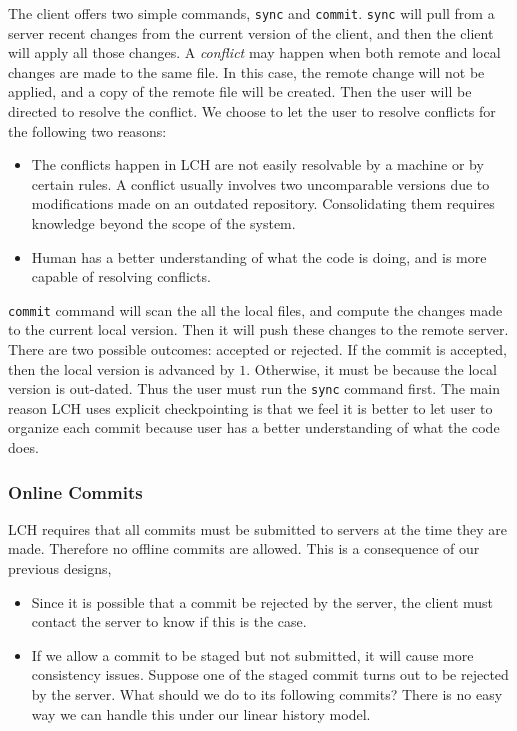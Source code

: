 \documentclass[11pt]{article}
\begin{document}
The client offers two simple commands, \texttt{sync} and \texttt{commit}.
\texttt{sync} will pull from a server recent changes from the current version of the client, and then the client will apply all those changes.
A \emph{conflict} may happen when both remote and local changes are made to the same file.
In this case, the remote change will not be applied, and a copy of the remote file will be created.
Then the user will be directed to resolve the conflict.
We choose to let the user to resolve conflicts for the following two reasons:
\begin{itemize}
    \item The conflicts happen in LCH are not easily resolvable by a machine or by certain rules.
        A conflict usually involves two uncomparable versions due to modifications made on an outdated repository.
        Consolidating them requires knowledge beyond the scope of the system.
    \item Human has a better understanding of what the code is doing, and is more capable of resolving conflicts.
\end{itemize}

\texttt{commit} command will scan the all the local files, and compute the changes made to the current local version.
Then it will push these changes to the remote server.
There are two possible outcomes: accepted or rejected.
If the commit is accepted, then the local version is advanced by $1$.
Otherwise, it must be because the local version is out-dated.
Thus the user must run the \texttt{sync} command first.
The main reason LCH uses explicit checkpointing is that we feel it is better to let user to organize each commit because user has a better understanding of what the code does.

\subsubsection{Online Commits}
LCH requires that all commits must be submitted to servers at the time they are made.
Therefore no offline commits are allowed.
This is a consequence of our previous designs,
\begin{itemize}
    \item Since it is possible that a commit be rejected by the server, the client must contact the server to know if this is the case.
    \item If we allow a commit to be staged but not submitted, it will cause more consistency issues.
        Suppose one of the staged commit turns out to be rejected by the server.
        What should we do to its following commits?
        There is no easy way we can handle this under our linear history model.
\end{itemize}
\end{document}
